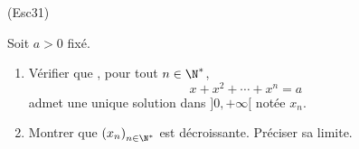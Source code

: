 \begin{tiny}(Esc31)\end{tiny}  Soit $a>0$ fixé.
\begin{enumerate}
 \item Vérifier que , pour tout $n\in \N^*$, 
\begin{displaymath}
 x+x^2+\cdots + x^n=a
\end{displaymath}
admet une unique solution dans $]0, +\infty[$ notée $x_n$.
\item Montrer que $\left( x_n\right) _{n\in \N^*}$ est décroissante. Préciser sa limite.
\end{enumerate}